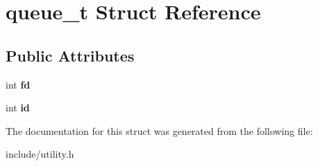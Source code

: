\hypertarget{structqueue__t}{\section{queue\-\_\-t \-Struct \-Reference}
\label{da/de4/structqueue__t}
}
\subsection*{\-Public \-Attributes}
\begin{DoxyCompactItemize}
\item 
\hypertarget{structqueue__t_ac029f683449143dfb455497c8f65be41}{int {\bfseries fd}}\label{da/de4/structqueue__t_ac029f683449143dfb455497c8f65be41}

\item 
\hypertarget{structqueue__t_a6d9023097f98241daf5e40c96a401c30}{int {\bfseries id}}\label{da/de4/structqueue__t_a6d9023097f98241daf5e40c96a401c30}

\end{DoxyCompactItemize}


\-The documentation for this struct was generated from the following file\-:\begin{DoxyCompactItemize}
\item 
include/utility.\-h\end{DoxyCompactItemize}
